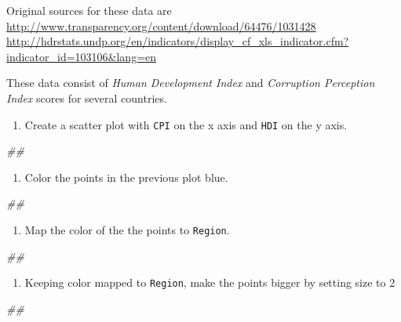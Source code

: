 \documentclass[
]{book}
\newenvironment{Shaded}{\begin{snugshade}}{\end{snugshade}}
\newcommand{\CommentTok}[1]{\textcolor[rgb]{0.56,0.35,0.01}{\textit{#1}}}
\providecommand{\tightlist}{%
  \setlength{\itemsep}{0pt}\setlength{\parskip}{0pt}}
\begin{document}
Original sources for these data are \url{http://www.transparency.org/content/download/64476/1031428} \url{http://hdrstats.undp.org/en/indicators/display_cf_xls_indicator.cfm?indicator_id=103106\&lang=en}

These data consist of \emph{Human Development Index} and \emph{Corruption Perception Index} scores for several countries.

\begin{enumerate}
\def\labelenumi{\arabic{enumi}.}
\tightlist
\item
  Create a scatter plot with \texttt{CPI} on the x axis and \texttt{HDI} on the y axis.
\end{enumerate}

\begin{Shaded}
\begin{Highlighting}[]
\CommentTok{\#\# }
\end{Highlighting}
\end{Shaded}

\begin{enumerate}
\def\labelenumi{\arabic{enumi}.}
\setcounter{enumi}{1}
\tightlist
\item
  Color the points in the previous plot blue.
\end{enumerate}

\begin{Shaded}
\begin{Highlighting}[]
\CommentTok{\#\# }
\end{Highlighting}
\end{Shaded}

\begin{enumerate}
\def\labelenumi{\arabic{enumi}.}
\setcounter{enumi}{2}
\tightlist
\item
  Map the color of the the points to \texttt{Region}.
\end{enumerate}

\begin{Shaded}
\begin{Highlighting}[]
\CommentTok{\#\# }
\end{Highlighting}
\end{Shaded}

\begin{enumerate}
\def\labelenumi{\arabic{enumi}.}
\setcounter{enumi}{3}
\tightlist
\item
  Keeping color mapped to \texttt{Region}, make the points bigger by setting size to 2
\end{enumerate}

\begin{Shaded}
\begin{Highlighting}[]
\CommentTok{\#\# }
\end{Highlighting}
\end{Shaded}
\end{document}
